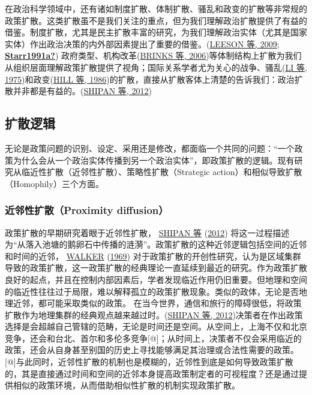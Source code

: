 \documentclass[
  12pt,
]{ctexart}
\begin{document}
在政治科学领域中，还有诸如制度扩散、体制扩散、骚乱和政变的扩散等非常规的政策扩散。这类扩散虽不是我们关注的重点，但为我们理解政治扩散提供了有益的借鉴。制度扩散，尤其是民主扩散丰富的研究，为我们理解政治实体（尤其是国家实体）作出政治决策的内外部因素提出了重要的借鉴。(\protect\hyperlink{ref-LeesonDean2009}{LEESON 等, 2009}; \protect\hyperlink{ref-Starr1991a}{\textbf{Starr1991a?}}) 政府类型、机构改革(\protect\hyperlink{ref-BrinksCoppedge2006}{BRINKS 等, 2006})等体制结构上扩散为我们从组织层面理解政策扩散提供了视角；国际关系学者尤为关心的战争、骚乱(\protect\hyperlink{ref-LiThompson1975}{LI 等, 1975})和政变(\protect\hyperlink{ref-HillRothchild1986}{HILL 等, 1986})的扩散，直接从扩散客体上清楚的告诉我们：政治扩散并非都是有益的。(\protect\hyperlink{ref-ShipanVolden2012}{SHIPAN 等, 2012})

\hypertarget{ux6269ux6563ux903bux8f91}{%
\subsection{扩散逻辑}\label{ux6269ux6563ux903bux8f91}}

无论是政策问题的识别、设定、采用还是修改，都面临一个共同的问题：``一个政策为什么会从一个政治实体传播到另一个政治实体''，即政策扩散的逻辑。现有研究从临近性扩散（近邻性扩散）、策略性扩散（Strategic action）和相似导致扩散（Homophily）三个方面。

\hypertarget{ux8fd1ux90bbux6027ux6269ux6563proximity-diffusion}{%
\subsubsection{近邻性扩散（Proximity diffusion）}\label{ux8fd1ux90bbux6027ux6269ux6563proximity-diffusion}}

政策扩散的早期研究着眼于近邻性扩散， \protect\hyperlink{ref-ShipanVolden2012}{SHIPAN 等} (\protect\hyperlink{ref-ShipanVolden2012}{2012}) 将这一过程描述为``从落入池塘的鹅卵石中传播的涟漪''。政策扩散的这种近邻逻辑包括空间的近邻和时间的近邻， \protect\hyperlink{ref-Walker1969}{WALKER} (\protect\hyperlink{ref-Walker1969}{1969}) 对于政策扩散的开创性研究，认为是区域集群导致的政策扩散，这一政策扩散的经典理论一直延续到最近的研究。作为政策扩散良好的起点，并且在控制内部因素后，学者发现临近作用仍旧重要。但地理和空间的临近性往往过于局限，难以解释孤立的政策扩散现象。类似的政体，无论是否地理近邻，都可能采取类似的政策。
在当今世界，通信和旅行的障碍很低，将政策扩散作为地理集群的经典观点越来越过时。(\protect\hyperlink{ref-ShipanVolden2012}{SHIPAN 等, 2012})决策者在作出政策选择是会超越自己管辖的范畴，无论是时间还是空间。从空间上，上海不仅和北京竞争，还会和台北、首尔和多伦多竞争{[}@{]}；从时间上，决策者不仅会采用临近的政策，还会从自身甚至别国的历史上寻找能够满足其治理或合法性需要的政策。{[}@{]}与此同时，近邻性扩散的机制也是模糊的，近邻性到底是如何导致政策扩散的，其是直接通过时间和空间的近邻本身提高政策制定者的可视程度？还是通过提供相似的政策环境，从而借助相似性扩散的机制实现政策扩散。
\end{document}
